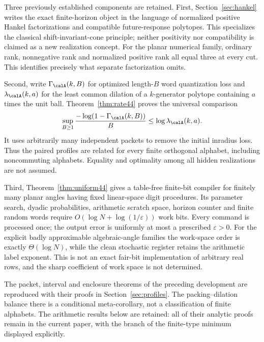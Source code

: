 Three previously established components are retained. First,
Section~\ref{sec:hankel} writes the exact finite-horizon object in the
language of normalized positive Hankel factorizations and compatible
future-response polytopes. This specializes the classical
shift-invariant-cone principle; neither positivity nor compatibility is
claimed as a new realization concept. For the planar numerical family,
ordinary rank, nonnegative rank and normalized positive rank all equal
three at every cut. This identifies precisely what separate
factorization omits.

Second, write $\Gamma_{\calA}(k,B)$ for optimized length-$B$ word
quantization loss and $\lambda_{\calA}(k,a)$ for the least common
dilation of a $k$-generator polytope containing $a$ times the unit ball.
Theorem~\ref{thm:rate44} proves the universal comparison
\begin{equation}\label{eq:intro-rate44}
 \sup_{B\ge1}\frac{-\log(1-\Gamma_{\calA}(k,B))}{B}
       \le \log\lambda_{\calA}(k,a).
\end{equation}
It uses arbitrarily many independent packets to remove the initial
inradius loss. Thus the paired profiles are related for every finite
orthogonal alphabet, including noncommuting alphabets. Equality and
optimality among all hidden realizations are not assumed.

Third, Theorem~\ref{thm:uniform44} gives a table-free finite-bit compiler
for finitely many planar angles having fixed linear-space digit
procedures. Its parameter search, dyadic probabilities, arithmetic
scratch space, horizon counter and finite random words require
$O(\log N+\log(1/\varepsilon))$ work bits. Every command is processed
once; the output error is uniformly at most a prescribed
$\varepsilon>0$. For the explicit badly approximable algebraic-angle
families the work-space order is exactly $\Theta(\log N)$, while the
clean stochastic register retains the arithmetic label exponent.
This is not an exact fair-bit implementation of arbitrary real rows,
and the sharp coefficient of work space is not determined.

The packet, interval and enclosure theorems of the preceding development
are reproduced with their proofs in Section~\ref{sec:profiles}.
The packing--dilation balance there is a conditional meta-corollary,
not a classification of finite alphabets. The arithmetic results below
are retained: all of their analytic proofs remain in the current paper,
with the branch of the finite-type minimum displayed explicitly.

